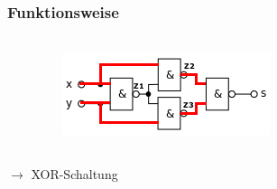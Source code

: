 \begin{frame}
    \frametitle{Funktionsweise}
    \framesubtitle{}
    \begin{columns}[c]
            \begin{center}
            \end{center}
            \begin{figure}[H]
            \begin{center}
                    \includegraphics[scale=0.7]{./img/schaltung/xornand_fun_11.png}
            \end{center}
            \end{figure}
    \end{columns}
    \pause
    \begin{block}{}
        \begin{center}
        $\rightarrow$ XOR-Schaltung
        \end{center}
    \end{block}
\end{frame}
